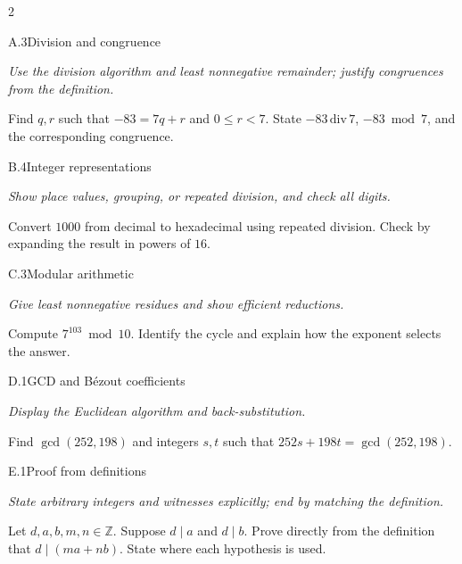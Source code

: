 \documentclass[9pt]{extarticle}
\begin{document}
\begin{multicols}{2}
\begin{CoreProblem}{A.3}{Division and congruence}
{\scriptsize\textit{Use the division algorithm and least nonnegative remainder; justify congruences from the definition.}\par}
Find $q,r$ such that $-83=7q+r$ and $0\le r<7$. State
$-83\,\mathrm{div}\,7$, $-83\bmod7$, and the corresponding congruence.
\end{CoreProblem}
\begin{CoreProblem}{B.4}{Integer representations}
{\scriptsize\textit{Show place values, grouping, or repeated division, and check all digits.}\par}
Convert $1000$ from decimal to hexadecimal using repeated division. Check by
expanding the result in powers of $16$.
\end{CoreProblem}
\begin{CoreProblem}{C.3}{Modular arithmetic}
{\scriptsize\textit{Give least nonnegative residues and show efficient reductions.}\par}
Compute $7^{103}\bmod10$. Identify the cycle and explain how the exponent
selects the answer.
\end{CoreProblem}
\columnbreak
\begin{CoreProblem}{D.1}{GCD and B\'ezout coefficients}
{\scriptsize\textit{Display the Euclidean algorithm and back-substitution.}\par}
Find $\gcd(252,198)$ and integers $s,t$ such that
$252s+198t=\gcd(252,198)$.
\end{CoreProblem}
\begin{CoreProblem}{E.1}{Proof from definitions}
{\scriptsize\textit{State arbitrary integers and witnesses explicitly; end by matching the definition.}\par}
Let $d,a,b,m,n\in\mathbb Z$. Suppose $d\mid a$ and $d\mid b$. Prove directly
from the definition that $d\mid(ma+nb)$. State where each hypothesis is used.
\end{CoreProblem}
\end{multicols}
\CoreWorkArea
\FormBreak
{}
\end{document}
